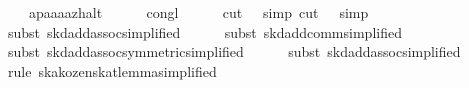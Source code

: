 \begin{isabellebody}
\ \ \ \ {}{}{}a{}{}p{}{}{}a{}{}a{}{}a{}{}a{}{}z{}{}halt{}{}\isanewline
\ \ \ \ \isamarkupfalse%
\ congl\isanewline
\ \ \ \ \isamarkupfalse%
\ {}cut\ {}\ {}{}\ simp{}\ cut\ {}\ {}{}\ simp{}\isanewline
\ \ \ \ \isamarkupfalse%
\ {}subst\ skd{}add{}assoc{}simplified{}{}\isanewline
\ \ \ \ \isamarkupfalse%
\ {}subst\ skd{}add{}comm{}simplified{}{}\ \isamarkupfalse%
\isanewline
\ \ \ \ \isamarkupfalse%
\ {}subst\ skd{}add{}assoc{}symmetric{}simplified{}{}\isanewline
\ \ \ \ \isamarkupfalse%
\ {}subst\ skd{}add{}assoc{}simplified{}{}\ \isamarkupfalse%
\isanewline
\ \ \ \ \isamarkupfalse%
\ {}rule\ ska{}kozen{}skat{}lemma{}simplified{}{}\isanewline

\end{isabellebody}
